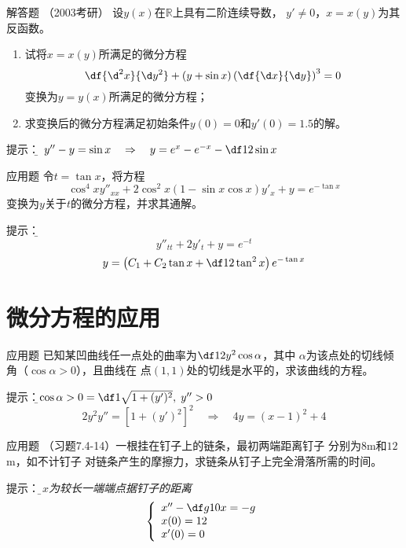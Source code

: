 \begin{frame}{解答题}
	\linespread{1.2}
	\alert{（2003考研）} 设$y(x)$在$\mathbb{R}$上具有二阶连续导数，
	$y'\ne 0$，$x=x(y)$为其反函数。
	\begin{enumerate}
	  \item 试将$x=x(y)$所满足的微分方程
	  $$\df{\d^2x}{\d y^2}+(y+\sin x)\left(\df{\d x}{\d y}\right)^3=0$$
	  变换为$y=y(x)$所满足的微分方程；
	  \item 求变换后的微分方程满足初始条件$y(0)=0$和$y'(0)=1.5$的解。
	\end{enumerate}
	
	\pause\alert{提示：}\it\b 
	$y''-y=\sin x\quad\Rightarrow\quad y=e^x-e^{-x}-\df12\sin x $
\end{frame}

\begin{frame}{应用题}
	\linespread{1.2}
	令$t=\tan x$，将方程
	$$\cos^4xy''_{xx}+2\cos^2x(1-\sin x\cos x)y'_x+y=e^{-\tan x}$$
	变换为$y$关于$t$的微分方程，并求其通解。
	
	\pause\alert{提示：}\it\b 
	$$y''_{tt}+2y'_t+y=e^{-t}$$
	$$y=\left(C_1+C_2\tan x+\df12\tan^2x\right)e^{-\tan x}$$
\end{frame}

\section{微分方程的应用}

\begin{frame}{应用题}
	\linespread{1.4}
	已知某凹曲线任一点处的曲率为$\df1{2y^2\cos\alpha}$，其中
	$\alpha$为该点处的切线倾角（$\cos\alpha>0$），且曲线在
	点$(1,1)$处的切线是水平的，求该曲线的方程。
	
	\pause\alert{提示：}\it\b $\cos\alpha>0=\df1{\sqrt{1+(y')^2}},
	\;y''>0$
	$$2y^2y''=[1+(y')^2]^2\quad\Rightarrow\quad
	4y=(x-1)^2+4$$
\end{frame}

\begin{frame}{应用题}
	\linespread{1.2}
	\alert{（习题7.4-14）}一根挂在钉子上的链条，最初两端距离钉子
	分别为$8$m和$12$m，如不计钉子
	对链条产生的摩擦力，求链条从钉子上完全滑落所需的时间。
	
	\pause\alert{提示：}\it\b 设$x$为较长一端端点据钉子的距离
	$$\left\{\begin{array}{l}
		x''-\df g{10}x=-g\\
		x(0)=12\\
		x'(0)=0
	\end{array}\right.$$
\end{frame}

